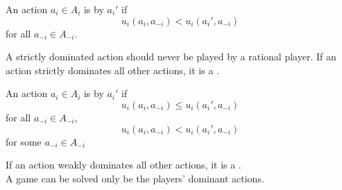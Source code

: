 \begin{definition}
    An action $a_i \in A_i$ is  by $a_i'$ if
    $$u_i(a_i, a_{-i}) < u_i(a_i', a_{-i})$$
    for all $a_{-i} \in A_{-i}$.
\end{definition}
A strictly dominated action should never be played by a rational player. If an action strictly dominates all other actions, it is a .
\begin{definition}
    An action $a_i \in A_i$ is  by $a_i'$ if
    $$u_i(a_i, a_{-i}) \le u_i(a_i', a_{-i})$$
    for all $a_{-i} \in A_{-i}$, 
    $$u_i(a_i, a_{-i}) < u_i(a_i', a_{-i})$$
    for some $a_{-i} \in A_{-i}$
\end{definition}
If an action weakly dominates all other actions, it is a . \\
A  game can be solved only be the players' dominant actions.

